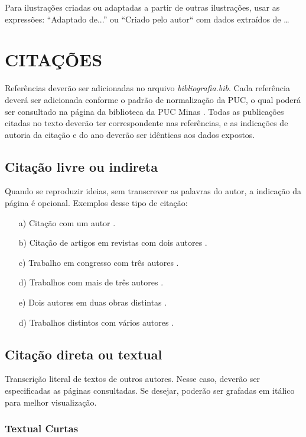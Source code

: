 Para ilustrações criadas ou adaptadas a partir de outras ilustrações, usar as expressões: 
“Adaptado de...” ou “Criado pelo autor`` com dados extraídos de \ldots
   
   
\section{\esp CITAÇÕES}


Referências deverão ser adicionadas no arquivo \textit{bibliografia.bib}. Cada referência deverá ser adicionada conforme o padrão de normalização da PUC, 
o qual poderá ser consultado na página da biblioteca da PUC Minas \cite{manualpuc}. Todas as publicações citadas no texto deverão ter correspondente nas referências, 
e as indicações de autoria da citação e do ano deverão ser idênticas aos dados expostos.


\subsection{\esp Citação livre ou indireta}

Quando se reproduzir ideias, sem transcrever as palavras do autor, a indicação da página é opcional. Exemplos desse tipo de citação:
\begin{enumerate} 
 \item [a)] Citação com um autor \cite{knuth}. 
 \item [b)] Citação de artigos em revistas com dois autores \cite{artigo01}.
  \item [c)] Trabalho em congresso com três autores \cite{dovzan:01}.
 \item [d)] Trabalhos com mais de três autores \cite{cap-livro}.
 \item [e)] Dois autores em duas obras distintas \cite{knuth,groupp}.
 \item [d)] Trabalhos distintos com vários autores \cite{congresso,cap-livro}.
 
\end{enumerate}

\subsection{\esp Citação direta ou textual}

Transcrição literal de textos de outros autores. Nesse caso, deverão ser especificadas as páginas consultadas. 
Se desejar, poderão ser grafadas em itálico para melhor visualização.

\subsubsection{\esp Textual Curtas}

